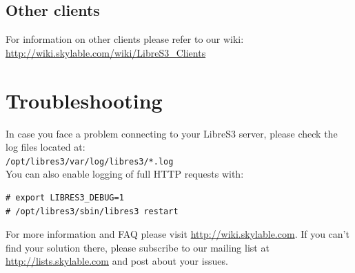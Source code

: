 \section*{Other clients}
For information on other clients please refer to our wiki:
\url{http://wiki.skylable.com/wiki/LibreS3_Clients}

\chapter{Troubleshooting}
In case you face a problem connecting to your LibreS3 server, please check
the log files located at:\\ \verb|/opt/libres3/var/log/libres3/*.log|\\
You can also enable logging of full HTTP requests with:
\small
\begin{lstlisting}
# export LIBRES3_DEBUG=1
# /opt/libres3/sbin/libres3 restart
\end{lstlisting}
\LARGE
For more information and FAQ please visit \url{http://wiki.skylable.com}.
If you can't find your solution there, please subscribe to our mailing list
at \url{http://lists.skylable.com} and post about your issues.

